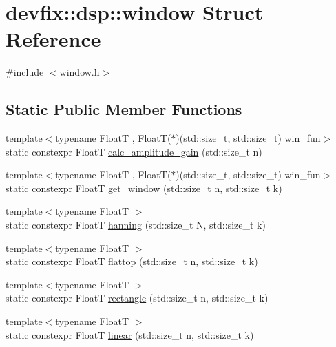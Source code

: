\hypertarget{structdevfix_1_1dsp_1_1window}{}\section{devfix\+:\+:dsp\+:\+:window Struct Reference}
\label{structdevfix_1_1dsp_1_1window}


{\ttfamily \#include $<$window.\+h$>$}

\subsection*{Static Public Member Functions}
\begin{DoxyCompactItemize}
\item 
{\footnotesize template$<$typename FloatT , Float\+T($\ast$)(std\+::size\+\_\+t, std\+::size\+\_\+t) win\+\_\+fun$>$ }\\static constexpr FloatT \hyperlink{structdevfix_1_1dsp_1_1window_aeba7905479c64bca5ac2fce0c6dbbf0b}{calc\+\_\+amplitude\+\_\+gain} (std\+::size\+\_\+t n)
\item 
{\footnotesize template$<$typename FloatT , Float\+T($\ast$)(std\+::size\+\_\+t, std\+::size\+\_\+t) win\+\_\+fun$>$ }\\static constexpr FloatT \hyperlink{structdevfix_1_1dsp_1_1window_aadef5782f4803866a74a6b9678c228c7}{get\+\_\+window} (std\+::size\+\_\+t n, std\+::size\+\_\+t k)
\item 
{\footnotesize template$<$typename FloatT $>$ }\\static constexpr FloatT \hyperlink{structdevfix_1_1dsp_1_1window_add23aaf0f9936857ad02a9d19b785849}{hanning} (std\+::size\+\_\+t N, std\+::size\+\_\+t k)
\item 
{\footnotesize template$<$typename FloatT $>$ }\\static constexpr FloatT \hyperlink{structdevfix_1_1dsp_1_1window_a43beeead6e8922f5be05b6e17f7f2664}{flattop} (std\+::size\+\_\+t n, std\+::size\+\_\+t k)
\item 
{\footnotesize template$<$typename FloatT $>$ }\\static constexpr FloatT \hyperlink{structdevfix_1_1dsp_1_1window_a15b34e7a9a7b76046b63347ac56b3236}{rectangle} (std\+::size\+\_\+t n, std\+::size\+\_\+t k)
\item 
{\footnotesize template$<$typename FloatT $>$ }\\static constexpr FloatT \hyperlink{structdevfix_1_1dsp_1_1window_a334a42b01504381fb13459f566aa2025}{linear} (std\+::size\+\_\+t n, std\+::size\+\_\+t k)
\end{DoxyCompactItemize}


